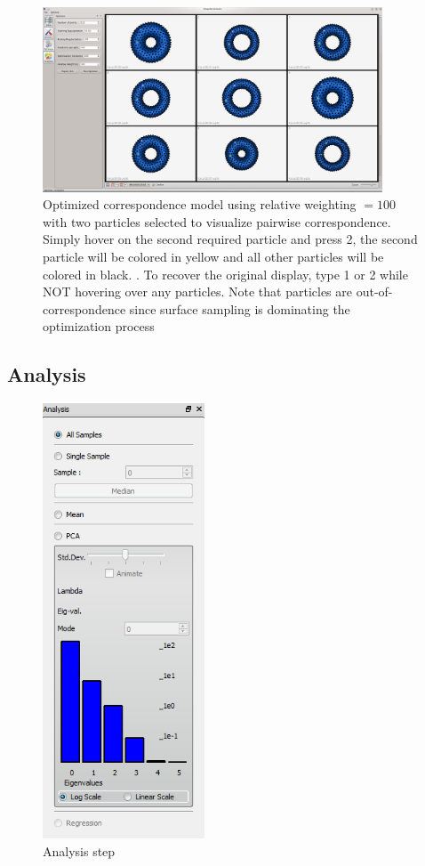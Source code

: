 \documentclass[letterpaper,12pt]{article}   %
\begin{document}
\begin{figure}[!htp]
\centering
\includegraphics[width=0.9\textwidth]{figs/rel100_hover2.png}
\caption{Optimized correspondence model using relative weighting $ = 100$ with two particles selected to visualize pairwise correspondence. Simply hover on the second required particle and press 2, the second particle will be colored in yellow and all other particles will be colored in black. . To recover the original display, type 1 or 2 while NOT hovering over any particles. Note that particles are out-of-correspondence since surface sampling is dominating the optimization process}
\label{fig:rel100_hover2}
\end{figure}

\subsection{Analysis}

\begingroup
\setlength\intextsep{0pt}

\begin{figure}
  \centering
    \includegraphics[width=0.43\textwidth]{figs/analysis.png}
  \caption{Analysis step}
\label{fig:analysis}
\end{figure}
\end{document}
